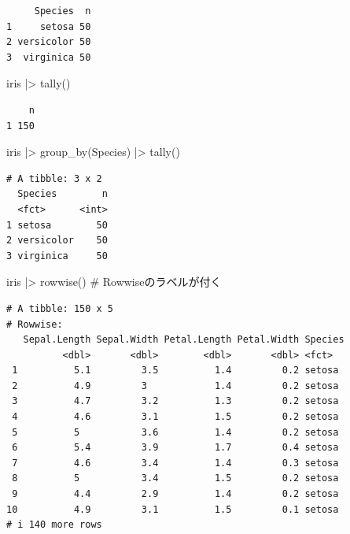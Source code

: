 \documentclass[
  letterpaper,
  DIV=11,
  numbers=noendperiod]{scrreprt}
\newenvironment{Shaded}{\begin{snugshade}}{\end{snugshade}}
\newcommand{\CommentTok}[1]{\textcolor[rgb]{0.37,0.37,0.37}{#1}}
\newcommand{\FunctionTok}[1]{\textcolor[rgb]{0.28,0.35,0.67}{#1}}
\newcommand{\NormalTok}[1]{\textcolor[rgb]{0.00,0.23,0.31}{#1}}
\newcommand{\SpecialCharTok}[1]{\textcolor[rgb]{0.37,0.37,0.37}{#1}}
\begin{document}
\begin{verbatim}
     Species  n
1     setosa 50
2 versicolor 50
3  virginica 50
\end{verbatim}

\begin{Shaded}
\begin{Highlighting}[]
\NormalTok{iris }\SpecialCharTok{|\textgreater{}} \FunctionTok{tally}\NormalTok{()}
\end{Highlighting}
\end{Shaded}

\begin{verbatim}
    n
1 150
\end{verbatim}

\begin{Shaded}
\begin{Highlighting}[]
\NormalTok{iris }\SpecialCharTok{|\textgreater{}} \FunctionTok{group\_by}\NormalTok{(Species) }\SpecialCharTok{|\textgreater{}} \FunctionTok{tally}\NormalTok{()}
\end{Highlighting}
\end{Shaded}

\begin{verbatim}
# A tibble: 3 x 2
  Species        n
  <fct>      <int>
1 setosa        50
2 versicolor    50
3 virginica     50
\end{verbatim}

\begin{Shaded}
\begin{Highlighting}[]
\NormalTok{iris }\SpecialCharTok{|\textgreater{}} \FunctionTok{rowwise}\NormalTok{() }\CommentTok{\# Rowwiseのラベルが付く}
\end{Highlighting}
\end{Shaded}

\begin{verbatim}
# A tibble: 150 x 5
# Rowwise: 
   Sepal.Length Sepal.Width Petal.Length Petal.Width Species
          <dbl>       <dbl>        <dbl>       <dbl> <fct>  
 1          5.1         3.5          1.4         0.2 setosa 
 2          4.9         3            1.4         0.2 setosa 
 3          4.7         3.2          1.3         0.2 setosa 
 4          4.6         3.1          1.5         0.2 setosa 
 5          5           3.6          1.4         0.2 setosa 
 6          5.4         3.9          1.7         0.4 setosa 
 7          4.6         3.4          1.4         0.3 setosa 
 8          5           3.4          1.5         0.2 setosa 
 9          4.4         2.9          1.4         0.2 setosa 
10          4.9         3.1          1.5         0.1 setosa 
# i 140 more rows
\end{verbatim}
\end{document}
